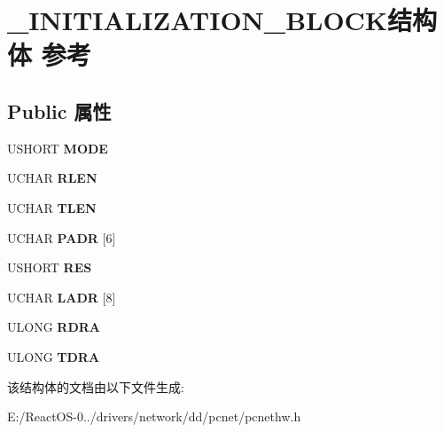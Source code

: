 \hypertarget{struct___i_n_i_t_i_a_l_i_z_a_t_i_o_n___b_l_o_c_k}{}\section{\+\_\+\+I\+N\+I\+T\+I\+A\+L\+I\+Z\+A\+T\+I\+O\+N\+\_\+\+B\+L\+O\+C\+K结构体 参考}
\label{struct___i_n_i_t_i_a_l_i_z_a_t_i_o_n___b_l_o_c_k}
\subsection*{Public 属性}
\begin{DoxyCompactItemize}
\item 
\mbox{\label{struct___i_n_i_t_i_a_l_i_z_a_t_i_o_n___b_l_o_c_k_a58fe777b18215843694cd4cda4e8519c}} 
U\+S\+H\+O\+RT {\bfseries M\+O\+DE}
\item 
\mbox{\label{struct___i_n_i_t_i_a_l_i_z_a_t_i_o_n___b_l_o_c_k_a245ef31c31a4730f1e4be6fbbfbafbc1}} 
U\+C\+H\+AR {\bfseries R\+L\+EN}
\item 
\mbox{\label{struct___i_n_i_t_i_a_l_i_z_a_t_i_o_n___b_l_o_c_k_a72bec37a187b8fb479eb0210bd364f78}} 
U\+C\+H\+AR {\bfseries T\+L\+EN}
\item 
\mbox{\label{struct___i_n_i_t_i_a_l_i_z_a_t_i_o_n___b_l_o_c_k_a341289ee7eeec86eac6ad405899d442a}} 
U\+C\+H\+AR {\bfseries P\+A\+DR} \mbox{[}6\mbox{]}
\item 
\mbox{\label{struct___i_n_i_t_i_a_l_i_z_a_t_i_o_n___b_l_o_c_k_aa155b47b4ae9158b82874e786c8d33e3}} 
U\+S\+H\+O\+RT {\bfseries R\+ES}
\item 
\mbox{\label{struct___i_n_i_t_i_a_l_i_z_a_t_i_o_n___b_l_o_c_k_a512d886d07076094f7f843b16e19272c}} 
U\+C\+H\+AR {\bfseries L\+A\+DR} \mbox{[}8\mbox{]}
\item 
\mbox{\label{struct___i_n_i_t_i_a_l_i_z_a_t_i_o_n___b_l_o_c_k_ac3bc933157a79d555578e74a71e5ec02}} 
U\+L\+O\+NG {\bfseries R\+D\+RA}
\item 
\mbox{\label{struct___i_n_i_t_i_a_l_i_z_a_t_i_o_n___b_l_o_c_k_a7e83181e637d8c5d6abcf02fd16fe396}} 
U\+L\+O\+NG {\bfseries T\+D\+RA}
\end{DoxyCompactItemize}


该结构体的文档由以下文件生成\+:\begin{DoxyCompactItemize}
\item 
E\+:/\+React\+O\+S-\/0../drivers/network/dd/pcnet/pcnethw.\+h\end{DoxyCompactItemize}
